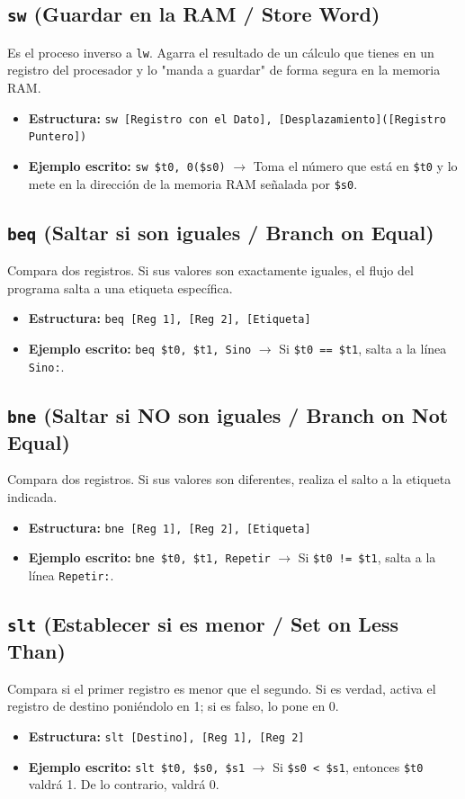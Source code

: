 \documentclass[12pt,a4paper]{article}
\begin{document}
\subsection{\texttt{sw} (Guardar en la RAM / Store Word)}
Es el proceso inverso a \texttt{lw}. Agarra el resultado de un cálculo que tienes en un registro del procesador y lo "manda a guardar" de forma segura en la memoria RAM.
\begin{itemize}
    \item \textbf{Estructura:} \texttt{sw [Registro con el Dato], [Desplazamiento]([Registro Puntero])}
    \item \textbf{Ejemplo escrito:} \texttt{sw \$t0, 0(\$s0)} $\rightarrow$ Toma el número que está en \texttt{\$t0} y lo mete en la dirección de la memoria RAM señalada por \texttt{\$s0}.
\end{itemize}

\subsection{\texttt{beq} (Saltar si son iguales / Branch on Equal)}
Compara dos registros. Si sus valores son exactamente iguales, el flujo del programa salta a una etiqueta específica.
\begin{itemize}
    \item \textbf{Estructura:} \texttt{beq [Reg 1], [Reg 2], [Etiqueta]}
    \item \textbf{Ejemplo escrito:} \texttt{beq \$t0, \$t1, Sino} $\rightarrow$ Si \texttt{\$t0 == \$t1}, salta a la línea \texttt{Sino:}.
\end{itemize}

\subsection{\texttt{bne} (Saltar si NO son iguales / Branch on Not Equal)}
Compara dos registros. Si sus valores son diferentes, realiza el salto a la etiqueta indicada.
\begin{itemize}
    \item \textbf{Estructura:} \texttt{bne [Reg 1], [Reg 2], [Etiqueta]}
    \item \textbf{Ejemplo escrito:} \texttt{bne \$t0, \$t1, Repetir} $\rightarrow$ Si \texttt{\$t0 != \$t1}, salta a la línea \texttt{Repetir:}.
\end{itemize}

\subsection{\texttt{slt} (Establecer si es menor / Set on Less Than)}
Compara si el primer registro es menor que el segundo. Si es verdad, activa el registro de destino poniéndolo en 1; si es falso, lo pone en 0.
\begin{itemize}
    \item \textbf{Estructura:} \texttt{slt [Destino], [Reg 1], [Reg 2]}
    \item \textbf{Ejemplo escrito:} \texttt{slt \$t0, \$s0, \$s1} $\rightarrow$ Si \texttt{\$s0 < \$s1}, entonces \texttt{\$t0} valdrá 1. De lo contrario, valdrá 0.
\end{itemize}
\end{document}
